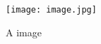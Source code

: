 \usepackage{graphics}
\usepackage{graphicx}

\begin{figure}[h]
	\centering
	\texttt{[image: image.jpg]}
	\caption{A image}
	\label{fig:image1}
\end{figure}
